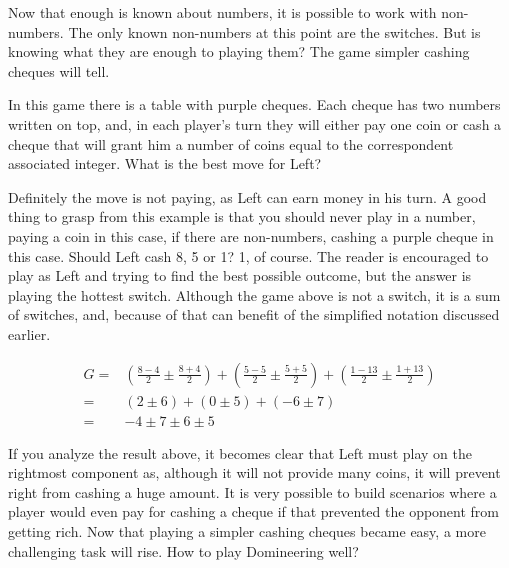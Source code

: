 

Now that enough is known about numbers, it is possible to work with non-numbers. The only known non-numbers at this point are the switches. But is knowing what they are enough to playing them? The game simpler cashing cheques will tell.

In this game there is a table with purple cheques. Each cheque has two numbers written on top, and, in each player's turn they will either pay one coin or cash a cheque that will grant him a number of coins equal to the correspondent associated integer. What is the best move for Left?

\begin{center}
\end{center}

Definitely the move is not paying, as Left can earn money in his turn. A good thing to grasp from this example is that you should never play in a number, paying a coin in this case, if there are non-numbers, cashing a purple cheque in this case. Should Left cash 8, 5 or 1? 1, of course. The reader is encouraged to play as Left and trying to find the best possible outcome, but the answer is playing the hottest switch. Although the game above is not a switch, it is a sum of switches, and, because of that can benefit of the simplified notation discussed earlier.

\begin{align*}
	G =& \left(\frac{8-4}{2} \pm \frac{8+4}{2}\right) + \left(\frac{5-5}{2} \pm \frac{5+5}{2}\right) + \left(\frac{1-13}{2} \pm \frac{1+13}{2}\right) \\
	  =& (2 \pm 6) + (0 \pm 5) + (-6 \pm 7)\\
	  =& -4 \pm 7 \pm 6 \pm 5
\end{align*}

If you analyze the result above, it becomes clear that Left must play on the rightmost component as, although it will not provide many coins, it will prevent right from cashing a huge amount. It is very possible to build scenarios where a player would even pay for cashing a cheque if that prevented the opponent from getting rich. Now that playing a simpler cashing cheques became easy, a more challenging task will rise. How to play Domineering well?


